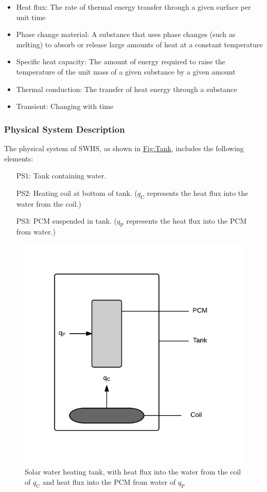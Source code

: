 \documentclass[12pt]{article}
\begin{document}
\begin{itemize}
\item{Heat flux: The rate of thermal energy transfer through a given surface per unit time}
\item{Phase change material: A substance that uses phase changes (such as melting) to absorb or release large amounts of heat at a constant temperature}
\item{Specific heat capacity: The amount of energy required to raise the temperature of the unit mass of a given substance by a given amount}
\item{Thermal conduction: The transfer of heat energy through a substance}
\item{Transient: Changing with time}
\end{itemize}
\subsubsection{Physical System Description}
\label{Sec:PhysSyst}
The physical system of SWHS, as shown in \hyperref[Figure:Tank]{Fig:Tank}, includes the following elements:

\begin{itemize}
\item[PS1:]{Tank containing water.}
\item[PS2:]{Heating coil at bottom of tank. (${q_{\text{C}}}$ represents the heat flux into the water from the coil.)}
\item[PS3:]{PCM suspended in tank. (${q_{\text{P}}}$ represents the heat flux into the PCM from water.)}
\end{itemize}
\begin{figure}
\begin{center}
\includegraphics[width=\textwidth]{../../../datafiles/SWHS/Tank.png}
\caption{Solar water heating tank, with heat flux into the water from the coil of ${q_{\text{C}}}$ and heat flux into the PCM from water of ${q_{\text{P}}}$}
\label{Figure:Tank}
\end{center}
\end{figure}
\end{document}
